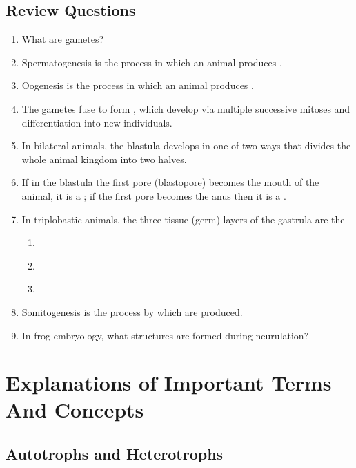 \documentclass[]{book}
\theoremstyle{definition}
\theoremstyle{definition}
\theoremstyle{definition}
\theoremstyle{remark}
\begin{document}
\section{Review Questions}\label{review-questions-10}

\begin{enumerate}
\def\labelenumi{\arabic{enumi}.}
\item
  What are gametes?
\item
  Spermatogenesis is the process in which an animal produces
  \underline{\phantom{answer}}.
\item
  Oogenesis is the process in which an animal produces
  \underline{\phantom{answer}}.
\item
  The gametes fuse to form \underline{\phantom{answer}}, which develop
  via multiple successive mitoses and differentiation into new
  individuals.
\item
  In bilateral animals, the blastula develops in one of two ways that
  divides the whole animal kingdom into two halves.
\item
  If in the blastula the first pore (blastopore) becomes the mouth of
  the animal, it is a \underline{\phantom{answer}}; if the first pore
  becomes the anus then it is a \underline{\phantom{answer}}.
\item
  In triplobastic animals, the three tissue (germ) layers of the
  gastrula are the
\begin{enumerate}
\def\labelenumi{\arabic{enumi}.}
\item
\underline{\phantom{answer}}
\item
\underline{\phantom{answer}}
\item
\underline{\phantom{answer}}
\end{enumerate}
\item
  Somitogenesis is the process by which \underline{\phantom{answer}}
  are produced.
\item
  In frog embryology, what structures are formed during neurulation?
\end{enumerate}

\appendix


\chapter{Explanations of Important Terms And
Concepts}\label{explanations-of-important-terms-and-concepts}

\section{Autotrophs and Heterotrophs}\label{autotrophs-and-heterotrophs}
\end{document}
